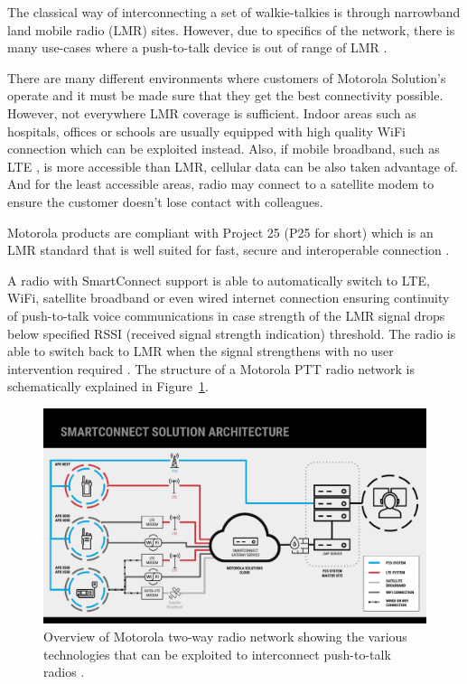 The classical way of interconnecting a set of walkie-talkies is through narrowband land mobile radio (LMR) sites.
However, due to specifics of the network, there is many use-cases where a push-to-talk device is out of range of LMR \cite{apxnextslides}. 

There are many different environments where customers of Motorola Solution's operate and it must be made sure that they get the best connectivity possible. 
However, not everywhere LMR coverage is sufficient. 
Indoor areas such as hospitals, offices or schools are usually equipped with high quality WiFi connection which can be exploited instead.
Also, if mobile broadband, such as LTE \cite{dahlman20134g}, is more accessible than LMR, cellular data can be also taken advantage of. And for the least accessible areas, radio may connect to a satellite modem to ensure the customer doesn't lose contact with colleagues.

Motorola products are compliant with Project 25 (P25 for short) which is an LMR standard that is well suited for fast, secure and interoperable connection \cite{project25}.

A radio with SmartConnect support is able to automatically switch to LTE, WiFi, satellite broadband or even wired internet connection ensuring continuity of push-to-talk voice communications in case strength of the LMR signal drops below specified RSSI (received signal strength indication) threshold. 
The radio is able to switch back to LMR when the signal strengthens with no user intervention required \cite{apxnextfactsheet} \cite{businesswireapxnext}.
The structure of a Motorola PTT radio network is schematically explained in Figure~\ref{smart-connect:smart-connect-architecture}.

\begin{figure}[h]
    \centering
    \includegraphics[width=\textwidth]{img/motorola-smart-connect-architecture.pdf}
    \caption{Overview of Motorola two-way radio network showing the various technologies that can be exploited to interconnect push-to-talk radios \cite{apxnextslides}.}
    \label{smart-connect:smart-connect-architecture}
\end{figure}

